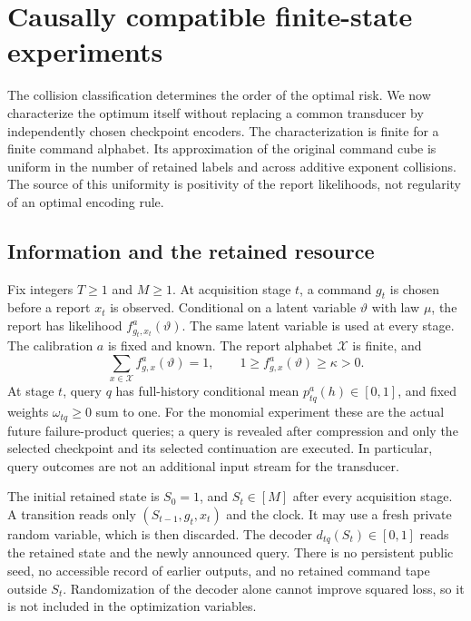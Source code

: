 \section{Causally compatible finite-state experiments}
\label{sec:v32-compatibility}

The collision classification determines the order of the optimal risk.
We now characterize the optimum itself without replacing a common
transducer by independently chosen checkpoint encoders. The characterization
is finite for a finite command alphabet. Its approximation of the original
command cube is uniform in the number of retained labels and across
additive exponent collisions. The source of this uniformity is positivity
of the report likelihoods, not regularity of an optimal encoding rule.

\subsection{Information and the retained resource}
Fix integers $T\ge1$ and $M\ge1$. At acquisition stage $t$, a command $g_t$ is
chosen before a report $x_t$ is observed. Conditional on a latent variable
$\vartheta$ with law $\mu$, the report has likelihood
$f^a_{g_t,x_t}(\vartheta)$. The same latent variable is used at every stage.
The calibration $a$ is fixed and known. The report alphabet $\mathcal X$ is
finite, and
\begin{equation}\label{eq:v32-positive}
 \sum_{x\in\mathcal X} f^a_{g,x}(\vartheta)=1,
 \qquad 1\ge f^a_{g,x}(\vartheta)\ge\kappa>0.
\end{equation}
At stage $t$, query $q$ has full-history conditional mean
$p^a_{tq}(h)\in[0,1]$, and fixed weights
$\omega_{tq}\ge0$ sum to one. For the monomial experiment these are the
actual future failure-product queries; a query is revealed after
compression and only the selected checkpoint and its selected continuation
are executed. In particular, query outcomes are not an additional input
stream for the transducer.

The initial retained state is $S_0=1$, and $S_t\in[M]$ after every
acquisition stage. A transition reads only $(S_{t-1},g_t,x_t)$ and the
clock. It may use a fresh private random variable, which is then discarded.
The decoder $d_{tq}(S_t)\in[0,1]$ reads the retained state and the newly
announced query. There is no persistent public seed, no accessible record
of earlier outputs, and no retained command tape outside $S_t$.
Randomization of the decoder alone cannot improve squared loss, so it is
not included in the optimization variables.

